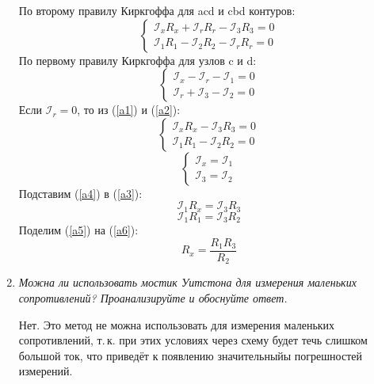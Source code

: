 \documentclass[a4paper,10pt]{article}
\begin{document}
\begin{enumerate}
По второму правилу Киркгоффа для acd и cbd контуров:
\begin{equation}\label{a1}
\begin{cases}
  \mathcal{I}_xR_x+\mathcal{I}_rR_r - \mathcal{I}_3R_3 = 0\\
  \mathcal{I}_1R_1 - \mathcal{I}_2R_2 - \mathcal{I}_rR_r = 0
  \end{cases}
\end{equation}
По первому правилу Киркгоффа для узлов c и d:
\begin{equation}\label{a2}
\begin{cases}
\mathcal{I}_x-\mathcal{I}_r-\mathcal{I}_1 = 0\\
\mathcal{I}_r+\mathcal{I}_3-\mathcal{I}_2 = 0
\end{cases}
\end{equation}
Если $\mathcal{I}_r = 0$, то из (\ref{a1}) и (\ref{a2}):
\begin{equation}\label{a3}
\begin{cases}
\mathcal{I}_xR_x-\mathcal{I}_3R_3 = 0\\
\mathcal{I}_1R_1 - \mathcal{I}_2R_2 = 0
\end{cases}
\end{equation}
\begin{equation}\label{a4}
\begin{cases}
\mathcal{I}_x=\mathcal{I}_1\\
\mathcal{I}_3=\mathcal{I}_2
\end{cases}
\end{equation}
Подставим (\ref{a4}) в (\ref{a3}):
\begin{equation}\label{a5}
\mathcal{I}_1R_x=\mathcal{I}_3R_3
\end{equation}
\begin{equation}\label{a6}
\mathcal{I}_1R_1=\mathcal{I}_3R_2
\end{equation}
Поделим (\ref{a5}) на (\ref{a6}):
$$R_x = \frac{R_1R_3}{R_2}$$
\item \textit{Можна ли использовать мостик Уитстона для измерения маленьких сопротивлений? Проанализируйте и обоснуйте ответ.}

Нет. Это метод не можна использовать для измерения маленьких сопротивлений, т.\,к. при этих условиях через схему будет течь слишком
большой ток, что приведёт к появлению значительныйы погрешностей измерений.
\end{enumerate}
\end{document}
